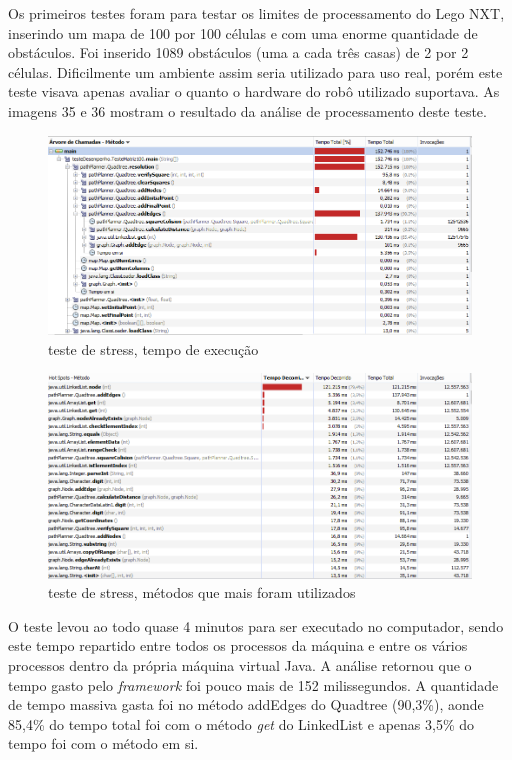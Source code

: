 Os primeiros testes foram para testar os limites de processamento do Lego NXT, inserindo um mapa de 100 por 100 células e com uma enorme quantidade de obstáculos. Foi inserido 1089 obstáculos (uma a cada três casas) de 2 por 2 células. Dificilmente um ambiente assim seria utilizado para uso real, porém este teste visava apenas avaliar o quanto o hardware do robô utilizado suportava. As imagens 35 e 36 mostram o resultado da análise de processamento deste teste.

\begin{figure}[h]
	\centering
	\label{fig35}
		\includegraphics[keepaspectratio=true,scale=0.6]{figuras/teste100_1.PNG}
	\caption{teste de stress, tempo de execução}
\end{figure}

\begin{figure}[h]
	\centering
	\label{fig36}
		\includegraphics[keepaspectratio=true,scale=0.6]{figuras/teste100_2.PNG}
	\caption{teste de stress, métodos que mais foram utilizados}
\end{figure}

O teste levou ao todo quase 4 minutos para ser executado no computador, sendo este tempo repartido entre todos os processos da máquina e entre os vários processos dentro da própria máquina virtual Java. A análise retornou que o tempo gasto pelo \textit{framework} foi pouco mais de 152 milissegundos. A quantidade de tempo massiva gasta foi no método addEdges do Quadtree (90,3\%), aonde 85,4\% do tempo total foi com o método \textit{get} do LinkedList e apenas 3,5\% do tempo foi com o método em si.

